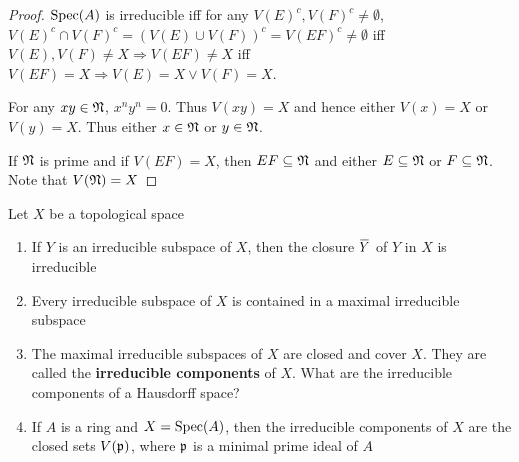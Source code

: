 \documentclass[11pt]{article}
\begin{document}
\begin{proof}
\(\operatorname{Spec}(A)\) is irreducible iff for
any \(V(E)^c,V(F)^c\neq\emptyset\), \(V(E)^c\cap V(F)^c=(V(E)\cup V(F))^c=V(EF)^c\neq\emptyset\) iff \(V(E),V(F)\neq X\Rightarrow V(EF)\neq X\)
iff \(V(EF)=X\Rightarrow V(E)=X\vee V(F)=X\).

For any \(xy\in\mathfrak{N}\), \(x^ny^n=0\). Thus \(V(xy)=X\) and hence either \(V(x)=X\) or \(V(y)=X\). Thus
either \(x\in\mathfrak{N}\) or \(y\in\mathfrak{N}\).

If \(\mathfrak{N}\) is prime and if \(V(EF)=X\), then \(EF\subseteq\mathfrak{N}\) and either \(E\subseteq\mathfrak{N}\) or \(F\subseteq\mathfrak{N}\). Note that \(V(\mathfrak{N})=X\)
\end{proof}

\begin{exercise}
\label{ex1.20}
Let \(X\) be a topological space
\begin{enumerate}
\item If \(Y\) is an irreducible subspace of \(X\), then the closure \(\barY\) of \(Y\) in \(X\) is irreducible
\item Every irreducible subspace of \(X\) is contained in a maximal irreducible subspace
\item The maximal irreducible subspaces of \(X\) are closed and cover \(X\). They are called the
\textbf{irreducible components} of \(X\). What are the irreducible components of a Hausdorff space?
\item If \(A\) is a ring and \(X=\operatorname{Spec}(A)\), then the irreducible components of \(X\) are the
closed sets \(V(\mathfrak{p})\), where \(\mathfrak{p}\) is a minimal prime ideal of \(A\)
\end{enumerate}
\end{exercise}
\end{document}
